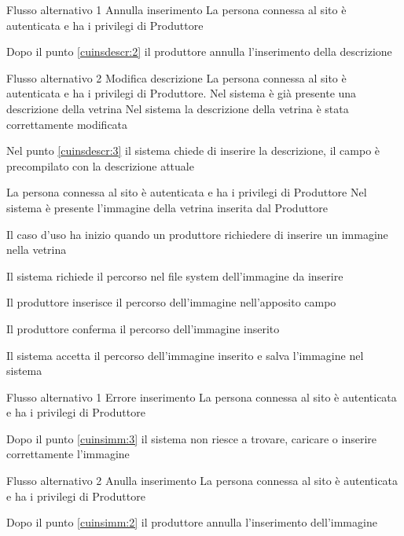 %
{Flusso alternativo 1}%
{Annulla inserimento}%
{La persona connessa al sito è autenticata e ha i privilegi di Produttore}%
{\postNulle}%
{\begin{enumCU}
		\item Dopo il punto \ref{cuinsdescr:2} il produttore annulla l'inserimento della descrizione
	\end{enumCU}}%
%
{Flusso alternativo 2}%
{Modifica descrizione}%
{La persona connessa al sito è autenticata e ha i privilegi di Produttore. Nel sistema è già presente una descrizione della vetrina}%
{Nel sistema la descrizione della vetrina è stata correttamente modificata}%
{\begin{enumCU}
		\item Nel punto \ref{cuinsdescr:3} il sistema chiede di inserire la descrizione, il campo è precompilato con la descrizione attuale
	\end{enumCU}}%

\tabcuvspace

{}
{La persona connessa al sito è autenticata e ha i privilegi di Produttore}
{Nel sistema è presente l'immagine della vetrina inserita dal Produttore}
{\begin{enumCU}
		\item Il caso d'uso ha inizio quando un produttore richiedere di inserire un immagine nella vetrina
		\item Il sistema richiede il percorso nel file system dell'immagine da inserire 
		\item Il produttore inserisce il percorso dell'immagine nell'apposito campo \label{cuinsimm:2}
		\item Il produttore conferma il percorso dell'immagine inserito \label{cuinsimm:3}
		\item Il sistema accetta il percorso dell'immagine inserito e salva l'immagine nel sistema
	\end{enumCU}}
%
{Flusso alternativo 1}%
{Errore inserimento}%
{La persona connessa al sito è autenticata e ha i privilegi di Produttore}%
{\postNulle}%
{\begin{enumCU}
		\item Dopo il punto \ref{cuinsimm:3} il sistema non riesce a trovare, caricare o inserire correttamente l'immagine
	\end{enumCU}}%
%
{Flusso alternativo 2}%
{Anulla inserimento}%
{La persona connessa al sito è autenticata e ha i privilegi di Produttore}%
{\postNulle}%
{\begin{enumCU}
		\item Dopo il punto \ref{cuinsimm:2} il produttore annulla l'inserimento dell'immagine
	\end{enumCU}}%


